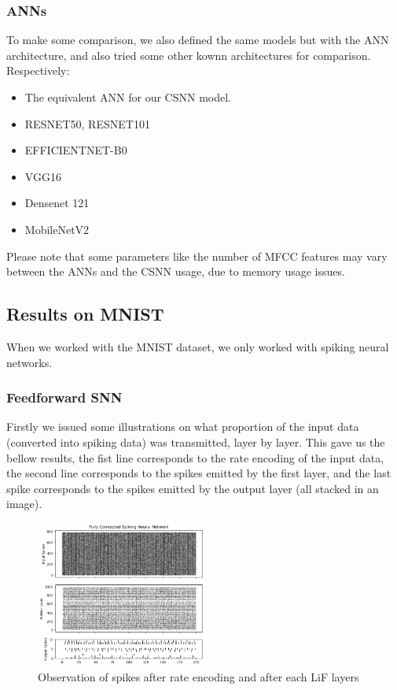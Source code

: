 \documentclass[11pt]{article}
\begin{document}
\subsubsection{ANNs}

To make some comparison, we also defined the same models but with the ANN architecture, and also tried some other kownn architectures for comparison. Respectively: 

\begin{itemize}
  \item The equivalent ANN for our CSNN model. 
  \item RESNET50, RESNET101
  \item EFFICIENTNET-B0
  \item VGG16
  \item Densenet 121
  \item MobileNetV2
\end{itemize}

Please note that some parameters like the number of MFCC features may vary between the ANNs and the CSNN usage, due to memory usage issues.

\pagebreak

\subsection{Results on MNIST}

When we worked with the MNIST dataset, we only worked with spiking neural networks.

\subsubsection*{Feedforward SNN}

Firstly we issued some illustrations on what proportion of the input data (converted into spiking data) was transmitted, layer by layer. This gave us the bellow results, the fist line corresponds to the rate encoding of the input data, the second line corresponds to the spikes emitted by the first layer, and the last spike corresponds to the spikes emitted by the output layer (all stacked in an image). 
\begin{figure}[H]
  \begin{center}
    \includegraphics[width=0.5\textwidth]{image/spikes_simple_snn.png}
    \caption{Observation of spikes after rate encoding and after each LiF layers}
    \label{fig:spikes_snn}
  \end{center} 
\end{figure}
\end{document}
